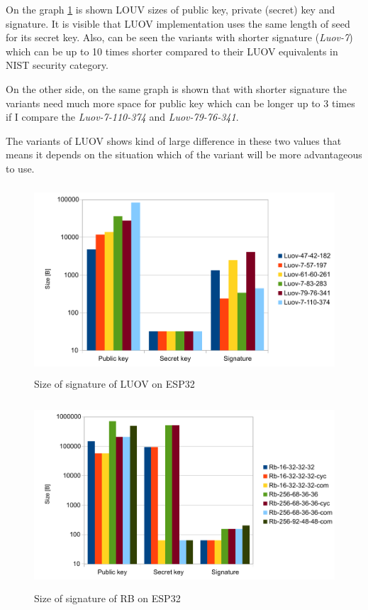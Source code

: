 \documentclass[thesis=M,english]{FITthesis}[2019/12/23]
\begin{document}
\bigskip
\noindent
On the graph \ref{sign-luov} is shown LOUV sizes of public key, private (secret) key and signature. It is visible that LUOV implementation uses the same length of seed for its secret key. Also, can be seen the variants with shorter signature (\textit{Luov-7}) which can be up to 10 times shorter compared to their LUOV equivalents in NIST security category.

\bigskip
\noindent
On the other side, on the same graph is shown that with shorter signature the variants need much more space for public key which can be longer up to 3 times if I compare the \textit{Luov-7-110-374} and \textit{Luov-79-76-341}.

\bigskip
\noindent
The variants of LUOV shows kind of large difference in these two values that means it depends on the situation which of the variant will be more advantageous to use.  

\begin{figure}[H]
\centering
\includegraphics[width=13cm,height=7cm]{images/sign-luov.pdf}
\caption{Size of signature of LUOV on ESP32}
\label{sign-luov}
\end{figure}

\begin{figure}[H]
\centering
\includegraphics[width=13cm,height=7cm]{images/sign-rb.pdf}
\caption{Size of signature of RB on ESP32}
\label{sign-rb}
\end{figure}
\end{document}
